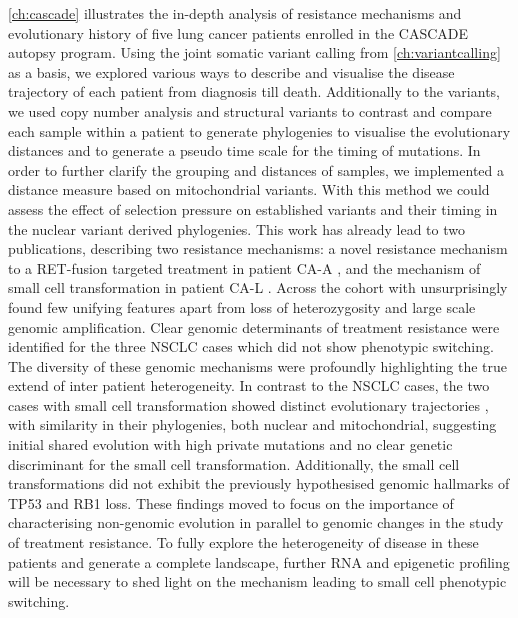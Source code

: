\autoref{ch:cascade} illustrates the in-depth analysis of resistance mechanisms and evolutionary history of five lung cancer patients enrolled in the CASCADE autopsy program. Using the joint somatic variant calling from \autoref{ch:variantcalling} as a basis, we explored various ways to describe and visualise the disease trajectory of each patient from diagnosis till death. Additionally to the variants, we used copy number analysis and structural variants to contrast and compare each sample within a patient to generate phylogenies to visualise the evolutionary distances and to generate a pseudo time scale for the timing of mutations. In order to further clarify the grouping and distances of samples, we implemented a distance measure based on mitochondrial variants. With this method we could assess the effect of selection pressure on established variants and their timing in the nuclear variant derived phylogenies. This work has already lead to two publications, describing two resistance mechanisms: a novel resistance mechanism to a RET-fusion targeted treatment in patient CA-A \cite{Solomon2020}, and the mechanism of small cell transformation in patient CA-L \cite{Burr2019}. Across the cohort with unsurprisingly found few unifying features apart from loss of heterozygosity and large scale genomic amplification. Clear genomic determinants of treatment resistance were identified for the three NSCLC cases which did not show phenotypic switching. The diversity of these genomic mechanisms were profoundly highlighting the true extend of inter patient heterogeneity. In contrast to the NSCLC cases, the two cases with small cell transformation showed distinct evolutionary trajectories , with similarity in their phylogenies, both nuclear and mitochondrial, suggesting initial shared evolution with high private mutations and no clear genetic discriminant for the small cell transformation. Additionally, the small cell transformations did not exhibit the previously hypothesised genomic hallmarks of TP53 and RB1 loss. These findings moved to focus on the importance of characterising non-genomic evolution in parallel to genomic changes in the study of treatment resistance. To fully explore the heterogeneity of disease in these patients and generate a complete landscape, further RNA and epigenetic profiling will be necessary to shed light on the mechanism leading to small cell phenotypic switching.

